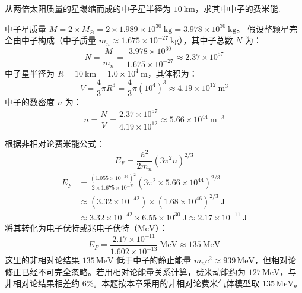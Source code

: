 \begin{exercise}\label{ex:27.8}
从两倍太阳质量的星塌缩而成的中子星半径为 $10 \ \mathrm{km}$，求其中中子的费米能.
\end{exercise}
\begin{solution}
中子星质量 $M = 2 \times M_{\odot} = 2 \times 1.989 \times 10^{30} \ \mathrm{kg} = 3.978 \times 10^{30} \ \mathrm{kg}$。
假设整颗星完全由中子构成（中子质量 $m_n \approx 1.675 \times 10^{-27} \ \mathrm{kg}$），其中子总数 $N$ 为：
$$ N = \frac{M}{m_n} = \frac{3.978 \times 10^{30}}{1.675 \times 10^{-27}} \approx 2.37 \times 10^{57} $$
中子星半径为 $R = 10 \ \mathrm{km} = 1.0 \times 10^4 \ \mathrm{m}$，其体积为：
$$ V = \frac{4}{3} \pi R^3 = \frac{4}{3} \pi (10^4)^3 \approx 4.19 \times 10^{12} \ \mathrm{m^3} $$
中子的数密度 $n$ 为：
$$ n = \frac{N}{V} = \frac{2.37 \times 10^{57}}{4.19 \times 10^{12}} \approx 5.66 \times 10^{44} \ \mathrm{m^{-3}} $$

根据非相对论费米能公式：
$$ E_F = \frac{\hbar^2}{2m_n} (3\pi^2 n)^{2/3} $$
\begin{align*}
    E_F &= \frac{(1.055 \times 10^{-34})^2}{2 \times 1.675 \times 10^{-27}} \left( 3\pi^2 \times 5.66 \times 10^{44} \right)^{2/3} \\
        &\approx (3.32 \times 10^{-42}) \times (1.68 \times 10^{46})^{2/3} \ \mathrm{J} \\
        &\approx 3.32 \times 10^{-42} \times 6.55 \times 10^{30} \ \mathrm{J} \approx 2.17 \times 10^{-11} \ \mathrm{J}
\end{align*}
将其转化为电子伏特或兆电子伏特（$\mathrm{MeV}$）：
$$ E_F = \frac{2.17 \times 10^{-11}}{1.602 \times 10^{-13}} \ \mathrm{MeV} \approx 135 \ \mathrm{MeV} $$
这里的非相对论结果 $135\,\mathrm{MeV}$ 低于中子的静止能量 $m_nc^2\approx939\,\mathrm{MeV}$，但相对论修正已经不可完全忽略。若用相对论能量关系计算，费米动能约为 $127\,\mathrm{MeV}$，与非相对论结果相差约 $6\%$。本题按本章采用的非相对论费米气体模型取 $135\,\mathrm{MeV}$。
\end{solution}

